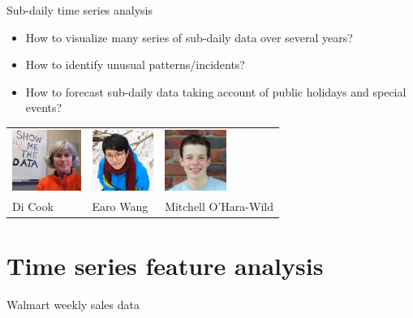\documentclass[14pt]{beamer}
\begin{document}
\begin{frame}{Sub-daily time series analysis}

\begin{itemize}
\item
  How to visualize many series of sub-daily data over several years?
\item
  How to identify unusual patterns/incidents?
\item
  How to forecast sub-daily data taking account of public holidays and
  special events?
\end{itemize}
\vspace*{1cm}

\begin{block}{}
\fontsize{11}{11}\sf
\centering\begin{tabular}{p{3cm}p{3cm}p{3.3cm}}
\includegraphics[height=2cm]{figs/dicook} &
\includegraphics[height=2cm]{figs/earowang} &
\includegraphics[height=2cm]{figs/mitch} \\
Di Cook & Earo Wang & Mitchell O'Hara-Wild
\end{tabular}
\end{block}

\end{frame}

\section{Time series feature analysis}

\begin{frame}{Walmart weekly sales data}


\end{frame}
\end{document}

